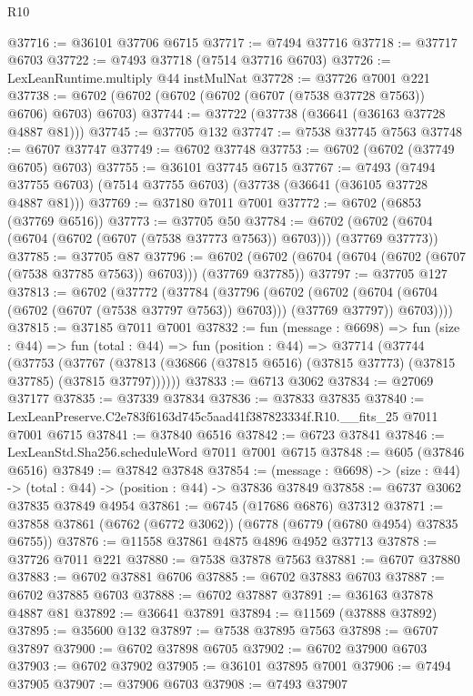 \begin{lexlean}{R10}
\begin{coremodule}
@37716 := @36101 @37706 @6715
@37717 := @7494 @37716
@37718 := @37717 @6703
@37722 := @7493 @37718 (@7514 @37716 @6703)
@37726 := LexLeanRuntime.multiply @44 instMulNat
@37728 := @37726 @7001 @221
@37738 := @6702 (@6702 (@6702 (@6702 (@6707 (@7538 @37728 @7563)) @6706) @6703) @6703)
@37744 := @37722 (@37738 (@36641 (@36163 @37728 @4887 @81)))
@37745 := @37705 @132
@37747 := @7538 @37745 @7563
@37748 := @6707 @37747
@37749 := @6702 @37748
@37753 := @6702 (@6702 (@37749 @6705) @6703)
@37755 := @36101 @37745 @6715
@37767 := @7493
    (@7494 @37755 @6703)
    (@7514 @37755 @6703)
    (@37738 (@36641 (@36105 @37728 @4887 @81)))
@37769 := @37180 @7011 @7001
@37772 := @6702 (@6853 (@37769 @6516))
@37773 := @37705 @50
@37784 := @6702 (@6702 (@6704 (@6704 (@6702 (@6707 (@7538 @37773 @7563)) @6703))) (@37769 @37773))
@37785 := @37705 @87
@37796 := @6702 (@6702 (@6704 (@6704 (@6702 (@6707 (@7538 @37785 @7563)) @6703))) (@37769 @37785))
@37797 := @37705 @127
@37813 := @6702
    (@37772
      (@37784
        (@37796
          (@6702
            (@6702 (@6704 (@6704 (@6702 (@6707 (@7538 @37797 @7563)) @6703))) (@37769 @37797))
            @6703))))
@37815 := @37185 @7011 @7001
@37832 := fun (message : @6698) =>
  fun (size : @44) =>
  fun (total : @44) =>
  fun (position : @44) =>
  @37714
    (@37744
      (@37753
        (@37767 (@37813 (@36866 (@37815 @6516) (@37815 @37773) (@37815 @37785) (@37815 @37797))))))
@37833 := @6713 @3062
@37834 := @27069 @37177
@37835 := @37339 @37834
@37836 := @37833 @37835
@37840 := LexLeanPreserve.C2e783f6163d745c5aad41f387823334f.R10.__fits_25 @7011 @7001 @6715
@37841 := @37840 @6516
@37842 := @6723 @37841
@37846 := LexLeanStd.Sha256.scheduleWord @7011 @7001 @6715
@37848 := @605 (@37846 @6516)
@37849 := @37842 @37848
@37854 := (message : @6698) -> (size : @44) -> (total : @44) -> (position : @44) -> @37836 @37849
@37858 := @6737 @3062 @37835 @37849 @4954
@37861 := @6745 (@17686 @6876) @37312
@37871 := @37858 @37861 (@6762 (@6772 @3062)) (@6778 (@6779 (@6780 @4954) @37835 @6755))
@37876 := @11558 @37861 @4875 @4896 @4952 @37713
@37878 := @37726 @7011 @221
@37880 := @7538 @37878 @7563
@37881 := @6707 @37880
@37883 := @6702 @37881 @6706
@37885 := @6702 @37883 @6703
@37887 := @6702 @37885 @6703
@37888 := @6702 @37887
@37891 := @36163 @37878 @4887 @81
@37892 := @36641 @37891
@37894 := @11569 (@37888 @37892)
@37895 := @35600 @132
@37897 := @7538 @37895 @7563
@37898 := @6707 @37897
@37900 := @6702 @37898 @6705
@37902 := @6702 @37900 @6703
@37903 := @6702 @37902
@37905 := @36101 @37895 @7001
@37906 := @7494 @37905
@37907 := @37906 @6703
@37908 := @7493 @37907

\end{coremodule}
\end{lexlean}
